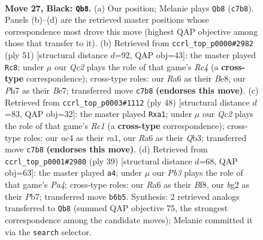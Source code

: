 \documentclass[11pt]{article}
\begin{document}
\clearpage

\begin{figure}[p]\centering
\begin{subfigure}{0.46\textwidth}\centering
\resizebox{\linewidth}{!}{%
\newchessgame
\chessboard[
  setfen={2b5/2q2pkp/rp3np1/6N1/PpN5/1P4P1/4RPBP/R5K1 b - - 5 27},
  showmover=false,
  pgfstyle=straightmove, color=movearrow, markmove={c7-b8}
]}
\caption{}
\end{subfigure}\hfill
\begin{subfigure}{0.46\textwidth}\centering
\resizebox{\linewidth}{!}{%
\newchessgame
\chessboard[
  setfen={4b1k1/4bpp1/4p2p/2r5/p7/PqN1P1P1/1P3PBP/1QR3K1 b - - 8 26},
  showmover=false,
  pgfstyle=straightmove, color=movearrow, markmove={c5-c8}
]}
\caption{}
\end{subfigure}
\\[4pt]
\begin{subfigure}{0.46\textwidth}\centering
\resizebox{\linewidth}{!}{%
\newchessgame
\chessboard[
  setfen={5rk1/1q2bpp1/4p2p/1p1p4/3PnB2/1Q3NPP/1P2PPK1/r1R5 w - - 0 25},
  showmover=false,
  pgfstyle=straightmove, color=movearrow, markmove={c1-a1}
]}
\caption{}
\end{subfigure}\hfill
\begin{subfigure}{0.46\textwidth}\centering
\resizebox{\linewidth}{!}{%
\newchessgame
\chessboard[
  setfen={5bk1/1p3p1p/1qn3p1/p2p4/8/1NP2N2/PP2RPPP/3R2K1 b - - 1 20},
  showmover=false,
  pgfstyle=straightmove, color=movearrow, markmove={a5-a4}
]}
\caption{}
\end{subfigure}
\caption{\textbf{Move 27, Black: \texttt{Qb8}.} (a) Our position; Melanie plays \texttt{Qb8} (\texttt{c7b8}). Panels (b)--(d) are the retrieved master positions whose correspondence most drove this move (highest QAP objective among those that transfer to it). (b) Retrieved from \texttt{ccrl\_top\_p0000\#2982} (ply 51) [structural distance $d$=92, QAP obj=43]: the master played \texttt{Rc8}; under $\mu$ our \emph{Qc2} plays the role of that game's \emph{Rc4} (a \textbf{cross-type} correspondence); cross-type roles: our \emph{R}a6 as their \emph{B}e8, our \emph{P}h7 as their \emph{B}e7; transferred move \texttt{c7b8} \textbf{(endorses this move)}. (c) Retrieved from \texttt{ccrl\_top\_p0003\#1112} (ply 48) [structural distance $d$=83, QAP obj=32]: the master played \texttt{Rxa1}; under $\mu$ our \emph{Qc2} plays the role of that game's \emph{Rc1} (a \textbf{cross-type} correspondence); cross-type roles: our \emph{n}c4 as their \emph{r}a1, our \emph{R}a6 as their \emph{Q}b3; transferred move \texttt{c7b8} \textbf{(endorses this move)}. (d) Retrieved from \texttt{ccrl\_top\_p0001\#2980} (ply 39) [structural distance $d$=68, QAP obj=63]: the master played \texttt{a4}; under $\mu$ our \emph{Pb3} plays the role of that game's \emph{Pa4}; cross-type roles: our \emph{R}a6 as their \emph{B}f8, our \emph{b}g2 as their \emph{P}b7; transferred move \texttt{b6b5}. Synthesis: 2 retrieved analogs transferred to \texttt{Qb8} (summed QAP objective 75, the strongest correspondence among the candidate moves); Melanie committed it via the \texttt{search} selector.}
\label{fig:thought-m53}
\end{figure}
\end{document}
